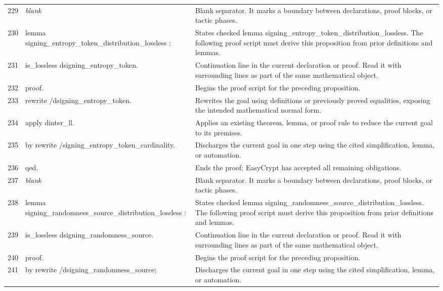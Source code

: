 \documentclass[10pt]{article}
\begin{document}
\begin{longtable}{r L{0.53\textwidth} L{0.37\textwidth}}
229 & {\ttfamily\scriptsize \emph{blank}} & Blank separator.  It marks a boundary between declarations, proof blocks, or tactic phases. \\
230 & {\ttfamily\scriptsize lemma signing\_entropy\_token\_distribution\_lossless :} & States checked lemma signing\_entropy\_token\_distribution\_lossless.  The following proof script must derive this proposition from prior definitions and lemmas. \\
231 & {\ttfamily\scriptsize   is\_lossless dsigning\_entropy\_token.} & Continuation line in the current declaration or proof.  Read it with surrounding lines as part of the same mathematical object. \\
232 & {\ttfamily\scriptsize proof.} & Begins the proof script for the preceding proposition. \\
233 & {\ttfamily\scriptsize rewrite /dsigning\_entropy\_token.} & Rewrites the goal using definitions or previously proved equalities, exposing the intended mathematical normal form. \\
234 & {\ttfamily\scriptsize apply dinter\_ll.} & Applies an existing theorem, lemma, or proof rule to reduce the current goal to its premises. \\
235 & {\ttfamily\scriptsize by rewrite /signing\_entropy\_token\_cardinality.} & Discharges the current goal in one step using the cited simplification, lemma, or automation. \\
236 & {\ttfamily\scriptsize qed.} & Ends the proof; EasyCrypt has accepted all remaining obligations. \\
237 & {\ttfamily\scriptsize \emph{blank}} & Blank separator.  It marks a boundary between declarations, proof blocks, or tactic phases. \\
238 & {\ttfamily\scriptsize lemma signing\_randomness\_source\_distribution\_lossless :} & States checked lemma signing\_randomness\_source\_distribution\_lossless.  The following proof script must derive this proposition from prior definitions and lemmas. \\
239 & {\ttfamily\scriptsize   is\_lossless dsigning\_randomness\_source.} & Continuation line in the current declaration or proof.  Read it with surrounding lines as part of the same mathematical object. \\
240 & {\ttfamily\scriptsize proof.} & Begins the proof script for the preceding proposition. \\
241 & {\ttfamily\scriptsize by rewrite /dsigning\_randomness\_source;} & Discharges the current goal in one step using the cited simplification, lemma, or automation. \\

\end{longtable}
\end{document}
